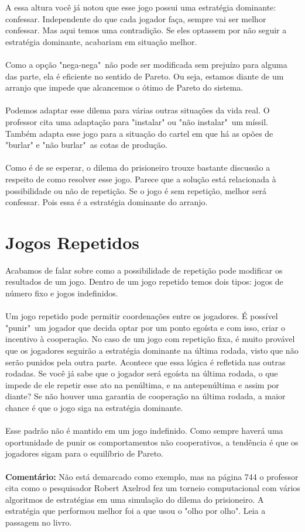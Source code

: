\documentclass[a4paper,11pt,oneside]{book}
\theoremstyle{definition}
\theoremstyle{break}
\begin{document}
A essa altura você já notou que esse jogo possui uma estratégia dominante: confessar. Independente do que cada jogador faça, sempre vai ser melhor confessar. Mas aqui temos uma contradição. Se eles optassem por não seguir a estratégia dominante, acabariam em situação melhor.
\\
\\
Como a opção "nega-nega"\ não pode ser modificada sem prejuízo para alguma das parte, ela é eficiente no sentido de Pareto. Ou seja, estamos diante de um arranjo que impede que alcancemos o ótimo de Pareto do sistema.
\\
\\
Podemos adaptar esse dilema para várias outras situações da vida real. O professor cita uma adaptação para "instalar" ou "não instalar"\ um míssil. Também adapta esse jogo para a situação do cartel em que há as opões de "burlar" e "não burlar"\ as cotas de produção.
\\
\\
Como é de se esperar, o dilema do prisioneiro trouxe bastante discussão a respeito de como resolver esse jogo. Parece que a solução está relacionada à possibilidade ou não de repetição. Se o jogo é sem repetição, melhor será confessar. Pois essa é a estratégia dominante do arranjo.

\section{Jogos Repetidos}

Acabamos de falar sobre como a possibilidade de repetição pode modificar os resultados de um jogo. Dentro de um jogo repetido temos dois tipos: jogos de número fixo e jogos indefinidos.
\\
\\
Um jogo repetido pode permitir coordenações entre os jogadores. É possível "punir"\ um jogador que decida optar por um ponto egoísta e com isso, criar o incentivo à cooperação. No caso de um jogo com repetição fixa, é muito provável que os jogadores seguirão a estratégia dominante na última rodada, visto que não serão punidos pela outra parte. Acontece que essa lógica é refletida nas outras rodadas. Se você já sabe que o jogador será egoísta na última rodada, o que impede de ele repetir esse ato na penúltima, e na antepenúltima e assim por diante? Se não houver uma garantia de cooperação na última rodada, a maior chance é que o jogo siga na estratégia dominante.
\\
\\
Esse padrão não é mantido em um jogo indefinido. Como sempre haverá uma oportunidade de punir os comportamentos não cooperativos, a tendência é que os jogadores sigam para o equilíbrio de Pareto.
\\
\\
\textbf{Comentário:} Não está demarcado como exemplo, mas na página 744 o professor cita como o pesquisador Robert Axelrod fez um torneio computacional com vários algoritmos de estratégias em uma simulação do dilema do prisioneiro. A estratégia que performou melhor foi a que usou o "olho por olho". Leia a passagem no livro.
\end{document}
